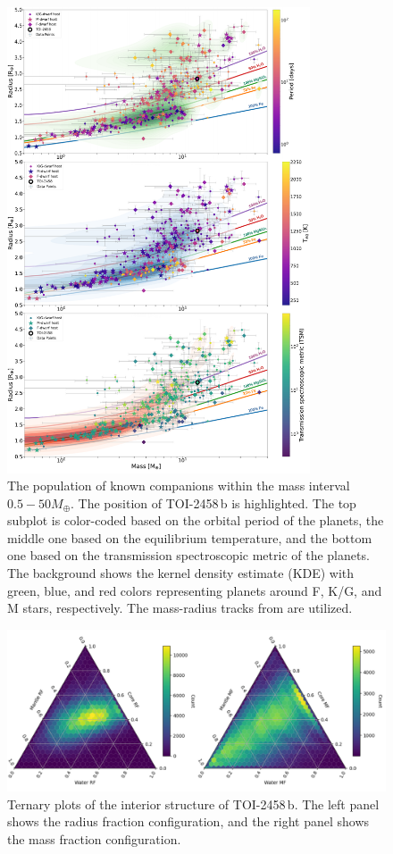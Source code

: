 \documentclass[traditabstract,longauth]{aa}
\begin{document}
\begin{figure}
\centering
\includegraphics[width=0.80\textwidth]{figures/mass_radius_v3.pdf}
\caption{The population of known companions within the mass interval $0.5-50 M_{\oplus}$. The position of TOI-2458\,b is highlighted. The top subplot is color-coded based on the orbital period of the planets, the middle one based on the equilibrium temperature, and the bottom one based on the transmission spectroscopic metric of the planets. The background shows the kernel density estimate (KDE) with green, blue, and red colors representing planets around F, K/G, and M stars, respectively. The mass-radius tracks from \citet{Zeng19} are utilized.} \label{fig:mas_radius}
\end{figure}

\begin{figure}
\centering
\includegraphics[width=1.0\textwidth]{figures/interior.pdf}
\caption{Ternary plots of the interior structure of TOI-2458\,b. The left panel shows the radius fraction configuration, and the right panel shows the mass fraction configuration.} \label{fig:interior}
\end{figure}
\end{document}

